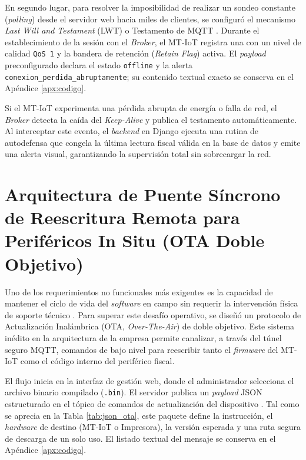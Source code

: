 \par En segundo lugar, para resolver la imposibilidad de realizar un sondeo constante (\textit{polling}) desde el servidor web hacia miles de clientes, se configuró el mecanismo \textit{Last Will and Testament} (LWT) o Testamento de MQTT \cite{OASIS_MQTT_v5}. Durante el establecimiento de la sesión con el \textit{Broker}, el MT-IoT registra una  con un nivel de calidad \texttt{QoS 1} y la bandera de retención (\textit{Retain Flag}) activa. El \textit{payload} preconfigurado declara el estado \texttt{offline} y la alerta \texttt{conexion\_perdida\_abruptamente}; su contenido textual exacto se conserva en el Apéndice \ref{apx:codigo}.\\

\par Si el MT-IoT experimenta una pérdida abrupta de energía o falla de red, el \textit{Broker} detecta la caída del \textit{Keep-Alive} y publica el testamento automáticamente. Al interceptar este evento, el \textit{backend} en Django ejecuta una rutina de autodefensa que congela la última lectura fiscal válida en la base de datos y emite una alerta visual, garantizando la supervisión total sin sobrecargar la red.

\section{Arquitectura de Puente Síncrono de Reescritura Remota para Periféricos In Situ (OTA Doble Objetivo)}

\par Uno de los requerimientos no funcionales más exigentes es la capacidad de mantener el ciclo de vida del \textit{software} en campo sin requerir la intervención física de soporte técnico \cite{WEF_IIoT_2018}. Para superar este desafío operativo, se diseñó un protocolo de Actualización Inalámbrica (OTA, \textit{Over-The-Air}) de doble objetivo. Este sistema inédito en la arquitectura de la empresa permite canalizar, a través del túnel seguro MQTT, comandos de bajo nivel para reescribir tanto el \textit{firmware} del MT-IoT como el código interno del periférico fiscal.\\

\par El flujo inicia en la interfaz de gestión web, donde el administrador selecciona el archivo binario compilado (\texttt{.bin}). El servidor publica un \textit{payload} JSON estructurado en el tópico de comandos de actualización del dispositivo \cite{OASIS_MQTT_v5}. Tal como se aprecia en la Tabla \ref{tab:json_ota}, este paquete define la instrucción, el \textit{hardware} de destino (MT-IoT o Impresora), la versión esperada y una ruta segura de descarga de un solo uso. El listado textual del mensaje se conserva en el Apéndice \ref{apx:codigo}.

